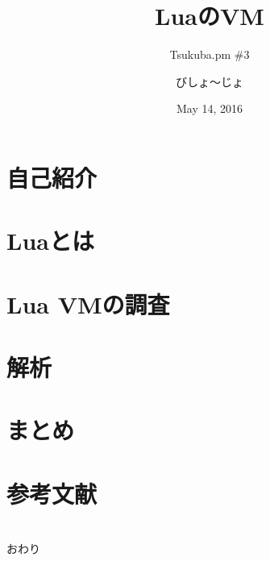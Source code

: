 \documentclass[aspectratio=169,unicode,handout]{beamer}
\title{LuaのVM}
\subtitle{Tsukuba.pm \#{}3}
\author{びしょ〜じょ}
\date{May 14, 2016}
\begin{document}
\maketitle
\skipnexttoc
\section{自己紹介}

\section{Luaとは}

\section{Lua VMの調査}

\section{解析}

\section{まとめ}

\skipnexttoc
\section{参考文献}

\skipnexttoc
\section*{}
\begin{frame}
	\begin{center}
		\Huge{}おわり
	\end{center}
\end{frame}
\end{document}

